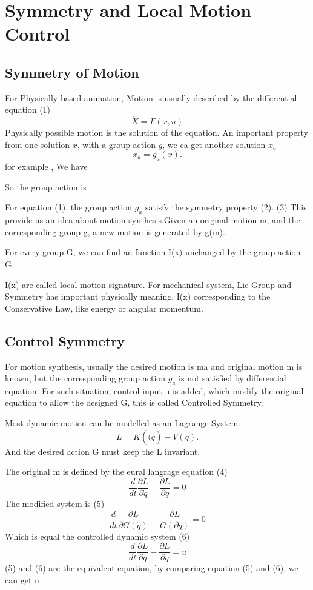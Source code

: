 \section{Symmetry and Local Motion Control}
\subsection{Symmetry of Motion}
For Physically-based animation,
Motion is usually described by  the differential equation (1)
\begin{equation}
\dot{X}=F(x,u)
\end{equation}
Physically possible motion is the solution of the equation.
An important property from one solution $x$, with a group action $g$, we ca get another solution $x_a$
\begin{equation}
x_a=g_a(x).
\end{equation}
for example
, 
We have 

So the group action is


For equation (1), the group action $g_a$ satisfy the symmetry property (2).
	(3)
This provide us an idea about motion synthesis.Given an original motion m, and the corresponding group g, a new motion is generated by g(m).

For every group G, we can find an function I(x) unchanged by the group action G, 

I(x) are called local motion signature. 
For mechanical system, Lie Group and Symmetry has important physically meaning. 
I(x) corresponding to the Conservative Law, like energy or angular momentum.

\subsection{Control Symmetry}
For motion synthesis, usually the desired motion is ma and original motion m is  known, but the corresponding group action $g_a$ is not satisfied by differential equation.
For such situation, control input u  is added, which modify the original equation to allow the designed G, this is called Controlled Symmetry.

Most dynamic motion can be modelled as an Lagrange System. 
\begin{equation}
L=K(\dot(q)-V(q).
\end{equation}
And the desired action G must keep the L invariant. 

The original m is defined by the eural langrage equation
 (4)
 \begin{equation}
\frac{d}{dt}\frac{\partial L}{\partial \dot{q}}-\frac{\partial L}{\partial q} = 0
\end{equation}
The modified system is 
 (5)
 \begin{equation}
\frac{d}{dt}\frac{\partial L}{\partial G(\dot{q})}-\frac{\partial L}{G(\partial q)} = 0
\end{equation}
Which is equal the controlled dynamic system
 (6)
\begin{equation}
\frac{d}{dt}\frac{\partial L}{\partial \dot{q}}-\frac{\partial L}{\partial q} = u
\end{equation}
(5) and (6) are the equivalent equation, by comparing  equation (5) and (6), we can get u
